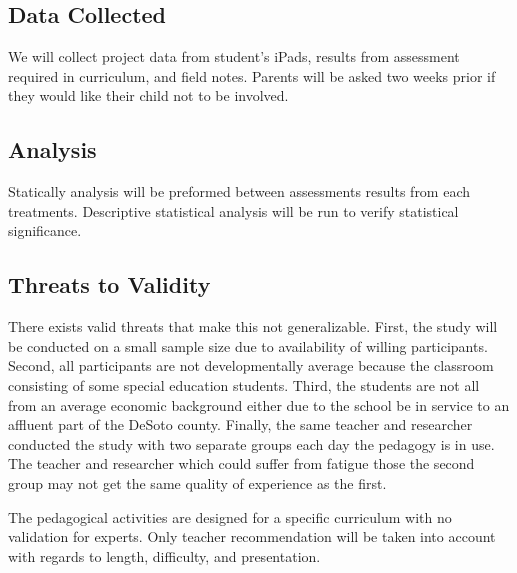 \documentclass[11pt, letterpaper, onecolumn]{article}
\begin{document}
\subsection{Data Collected}
%
We will collect project data from student’s iPads, results from assessment required in curriculum, and field notes.
%
Parents will be asked two weeks prior if they would like their child not to be involved.
%
%

\subsection{Analysis}
%
%
Statically analysis will be preformed between assessments results from each treatments. Descriptive statistical analysis will be run to verify statistical significance.
%
%

\subsection{Threats to Validity}
%
There exists valid threats that make this not generalizable.
%
First, the study will be conducted on a small sample size due to availability of willing participants.
%
Second, all participants are not developmentally average because the classroom consisting of some special education students.
%
Third, the students are not all from an average economic background either due to the school be in service to an affluent part of the DeSoto county.
%
Finally, the same teacher and researcher conducted the study with two separate groups each day the pedagogy is in use. 
%
The teacher and researcher which could suffer from fatigue those the second group may not get the same quality of experience as the first.

%
The pedagogical activities are designed for a specific curriculum with no validation for experts.
%
Only teacher recommendation will be taken into account with regards to length, difficulty, and presentation.
%

\end{document}
